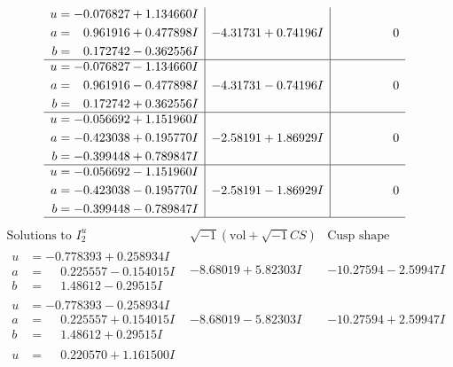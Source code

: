 \documentclass[1p]{elsarticle_modified}
\theoremstyle{definition}
\newcommand{\I}{\sqrt{-1}}
\begin{document}
$$\begin{array}{c|c|c}
\begin{aligned}
u &= -0.076827 + 1.134660 I \\
a &= \phantom{-}0.961916 + 0.477898 I \\
b &= \phantom{-}0.172742 - 0.362556 I\end{aligned}
 & -4.31731 + 0.74196 I & \phantom{-0.000000 } 0 \\ \hline\begin{aligned}
u &= -0.076827 - 1.134660 I \\
a &= \phantom{-}0.961916 - 0.477898 I \\
b &= \phantom{-}0.172742 + 0.362556 I\end{aligned}
 & -4.31731 - 0.74196 I & \phantom{-0.000000 } 0 \\ \hline\begin{aligned}
u &= -0.056692 + 1.151960 I \\
a &= -0.423038 + 0.195770 I \\
b &= -0.399448 + 0.789847 I\end{aligned}
 & -2.58191 + 1.86929 I & \phantom{-0.000000 } 0 \\ \hline\begin{aligned}
u &= -0.056692 - 1.151960 I \\
a &= -0.423038 - 0.195770 I \\
b &= -0.399448 - 0.789847 I\end{aligned}
 & -2.58191 - 1.86929 I & \phantom{-0.000000 } 0\\
 \hline 
 \end{array}$$\newpage$$\begin{array}{c|c|c}  
\text{Solutions to }I^u_{2}& \I (\text{vol} + \sqrt{-1}CS) & \text{Cusp shape}\\
 \hline 
\begin{aligned}
u &= -0.778393 + 0.258934 I \\
a &= \phantom{-}0.225557 - 0.154015 I \\
b &= \phantom{-}1.48612 - 0.29515 I\end{aligned}
 & -8.68019 + 5.82303 I & -10.27594 - 2.59947 I \\ \hline\begin{aligned}
u &= -0.778393 - 0.258934 I \\
a &= \phantom{-}0.225557 + 0.154015 I \\
b &= \phantom{-}1.48612 + 0.29515 I\end{aligned}
 & -8.68019 - 5.82303 I & -10.27594 + 2.59947 I \\ \hline\begin{aligned}
u &= \phantom{-}0.220570 + 1.161500 I \\

\end{aligned}
\end{array}$$
\end{document}
